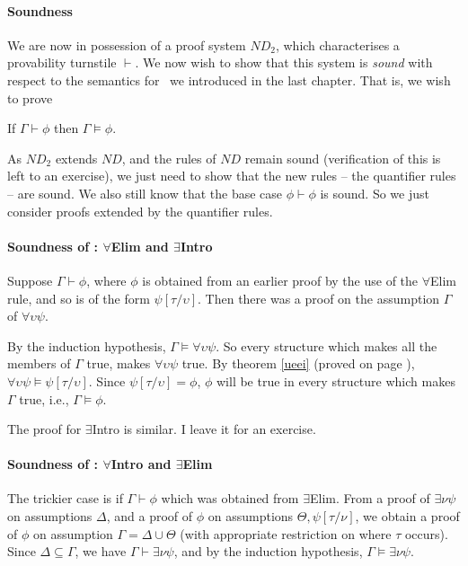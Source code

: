 \paragraph{Soundness}

We are now in possession of a proof system $ND_{2}$, which characterises a provability turnstile $\vdash$. We now wish to show that this system is \emph{sound} with respect to the semantics for \ltwo\ we introduced in the last chapter. That is, we wish to prove \begin{theorem}[Soundness]
	If $\Gamma \vdash \phi$ then $\Gamma \vDash \phi$.
\end{theorem}
As $ND_{2}$ extends $ND$, and the rules of $ND$ remain sound (verification of this is left to an exercise), we just need to show that the new rules – the quantifier rules – are sound. We also still know that the base case $\phi\vdash\phi$ is sound. So we just consider proofs extended by the quantifier rules.
\paragraph{Soundness of \ltwo: $\forall$Elim and $\exists$Intro}

Suppose $\Gamma \vdash \phi$, where $\phi$ is obtained from an earlier proof by the use of the $\forall$Elim rule, and so is of the form $\psi[\tau/\upsilon]$. Then there was a proof on the assumption $\Gamma$ of $\forall \upsilon \psi$.

By the induction hypothesis, $\Gamma \vDash \forall \upsilon \psi$. So every structure which makes all the members of $\Gamma$ true, makes $\forall \upsilon \psi$ true. By theorem \ref{ueei} (proved on page \pageref{ueei}), $\forall \upsilon \psi \vDash \psi[\tau/\upsilon]$. Since $\psi[\tau/\upsilon]=\phi$, $\phi$ will be true in every structure which makes $\Gamma$ true, i.e., $\Gamma \vDash \phi$.

 The proof for $\exists$Intro is similar. I leave it for an exercise.


\paragraph{Soundness of \ltwo: $\forall$Intro and $\exists$Elim}



The trickier case is if $\Gamma\vdash\phi$ which was obtained from $\exists$Elim. From a proof of $\exists \nu \psi$ on assumptions $\Delta$, and a proof of $\phi$ on assumptions $\Theta,\psi[\tau/\nu]$, we obtain a proof of $\phi$ on assumption $\Gamma=\Delta\cup\Theta$ (with appropriate restriction on where $\tau$ occurs). 
Since $\Delta\subseteq\Gamma$, we have $\Gamma\vdash \exists \nu \psi$, and by the induction hypothesis, $\Gamma \vDash \exists \nu \psi$. 

